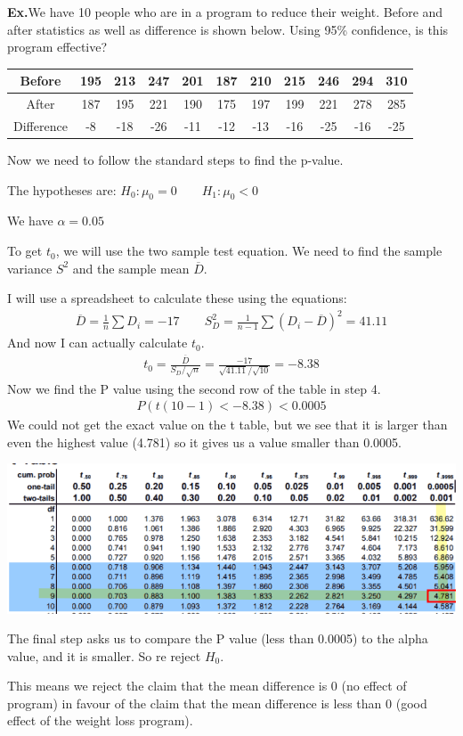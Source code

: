 \documentclass[12pt,letterpaper]{article} \usepackage{amsmath} \usepackage{graphicx} \usepackage[margin=1in]{geometry} \usepackage{longtable}  \usepackage{amssymb}
\begin{document}
	\begin{mdframed}
		\textbf{Ex.}We have 10 people who are in a program to reduce their weight. Before and after statistics as well as difference is shown below. Using 95\% confidence, is this program effective?
		
		\begin{center}
			\begin{tabular}{|c|c|c|c|c|c|c|c|c|c|c|}
				\hline
				Before & 195 & 213 & 247 & 201 & 187 & 210 & 215 & 246 & 294 & 310 \\
				\hline
				After & 187 & 195 & 221 & 190 & 175 & 197 & 199 & 221 & 278 & 285 \\
				\hline
				Difference & -8 & -18 & -26 & -11 & -12 & -13 & -16 & -25 & -16 & -25 \\
				\hline
			\end{tabular}
		\end{center}
		Now we need to follow the standard steps to find the p-value. 
		
		The hypotheses are: $H_0: \mu_0 = 0 \qquad H_1: \mu_0 < 0$
		
		We have $\alpha = 0.05$
		
		To get $t_0$, we will use the two sample test equation. We need to find the sample variance $S^2$ and the sample mean $\overline D$. 
		
		I will use a spreadsheet to calculate these using the equations:
		\begin{align*}
			\overline D = \frac{1}{n} \sum D_i = -17\qquad S_D^2 = \frac{1}{n-1}\sum (D_i - \overline D)^2 = 41.11
		\end{align*}
		And now I can actually calculate $t_0$.
		\begin{align*}
			t_0 = \frac{\overline D}{S_D / \sqrt n} = \frac{-17}{\sqrt{41.11} / \sqrt{10}} = -8.38
		\end{align*}
		Now we find the P value using the second row of the table in step 4. 
		\begin{align*}
			P(t(10-1) < -8.38) <0.0005
		\end{align*}
		We could not get the exact value on the t table, but we see that it is larger than even the highest value (4.781) so it gives us a value smaller than 0.0005.
		\begin{center}
			\includegraphics[width=0.9\linewidth]{t-table-ex}
		\end{center}
		The final step asks us to compare the P value (less than 0.0005) to the alpha value, and it is smaller. So re reject $H_0$. 
		
		This means we reject the claim that the mean difference is 0 (no effect of program) in favour of the claim that the mean difference is less than 0 (good effect of the weight loss program). 
		
		
	\end{mdframed}
	
\end{document}

